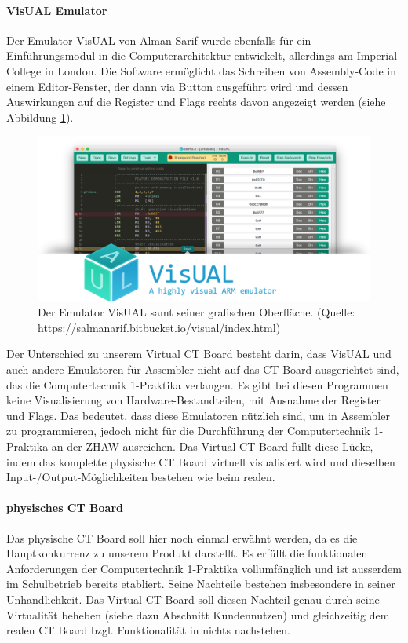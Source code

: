\documentclass[10pt]{article}
\begin{document}
\paragraph{VisUAL Emulator}
Der Emulator VisUAL von Alman Sarif wurde ebenfalls für ein Einführungsmodul in die Computerarchitektur entwickelt, allerdings am Imperial College in London. Die Software ermöglicht das Schreiben von Assembly-Code in einem Editor-Fenster, der dann via Button ausgeführt wird und dessen Auswirkungen auf die Register und Flags rechts davon angezeigt werden (siehe Abbildung \ref{emulator}).
\begin{figure}[h]
\includegraphics[width=\textwidth]{visual_emulator}
\caption{Der Emulator VisUAL samt seiner grafischen Oberfläche. (Quelle: https://salmanarif.bitbucket.io/visual/index.html)}
\label{emulator}
\end{figure}
Der Unterschied zu unserem \glqq Virtual CT Board\grqq{} besteht darin, dass VisUAL und auch andere Emulatoren für Assembler nicht auf das CT Board ausgerichtet sind, das die \glqq Computertechnik 1\grqq{}-Praktika verlangen. Es gibt bei diesen Programmen keine Visualisierung von Hardware-Bestandteilen, mit Ausnahme der Register und Flags. Das bedeutet, dass diese Emulatoren nützlich sind, um in Assembler zu programmieren, jedoch nicht für die Durchführung der \glqq Computertechnik 1\grqq-Praktika an der ZHAW ausreichen. Das \glqq Virtual CT Board\grqq{} füllt diese Lücke, indem das komplette physische CT Board virtuell visualisiert wird und dieselben Input-/Output-Möglichkeiten bestehen wie beim realen.

\paragraph{physisches CT Board} 

Das physische CT Board soll hier noch einmal erwähnt werden, da es die Hauptkonkurrenz zu unserem Produkt darstellt. Es erfüllt die funktionalen Anforderungen der \glqq Computertechnik 1\grqq-Praktika vollumfänglich und ist ausserdem im Schulbetrieb bereits etabliert. Seine Nachteile bestehen insbesondere in seiner Unhandlichkeit. Das \glqq Virtual CT Board\grqq{} soll diesen Nachteil genau durch seine Virtualität beheben (siehe dazu Abschnitt \glqq Kundennutzen\grqq) und gleichzeitig dem realen CT Board bzgl. Funktionalität in nichts nachstehen. 
\end{document}
